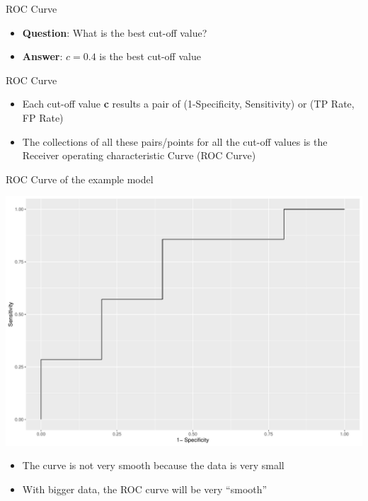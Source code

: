 \documentclass[
  ignorenonframetext,
]{beamer}
\providecommand{\tightlist}{%
  \setlength{\itemsep}{0pt}\setlength{\parskip}{0pt}}
\begin{document}
\begin{frame}{ROC Curve}
\protect\hypertarget{roc-curve}{}

\begin{itemize}
\tightlist
\item
  \textbf{Question}: What is the best cut-off value?
\item
  \textbf{Answer}: \(c = 0.4\) is the best cut-off value
\end{itemize}

\end{frame}

\begin{frame}{ROC Curve}
\protect\hypertarget{roc-curve-1}{}

\begin{itemize}
\tightlist
\item
  Each cut-off value \textbf{c} results a pair of (1-Specificity,
  Sensitivity) or (TP Rate, FP Rate)
\item
  The collections of all these pairs/points for all the cut-off values
  is the Receiver operating characteristic Curve (ROC Curve)
\end{itemize}

\end{frame}

\begin{frame}{ROC Curve of the example model}
\protect\hypertarget{roc-curve-of-the-example-model}{}

\includegraphics{fa_measuring_performance2_files/figure-beamer/unnamed-chunk-5-1.pdf}

\begin{itemize}
\tightlist
\item
  The curve is not very smooth because the data is very small
\item
  With bigger data, the ROC curve will be very ``smooth''
\end{itemize}

\end{frame}
\end{document}
